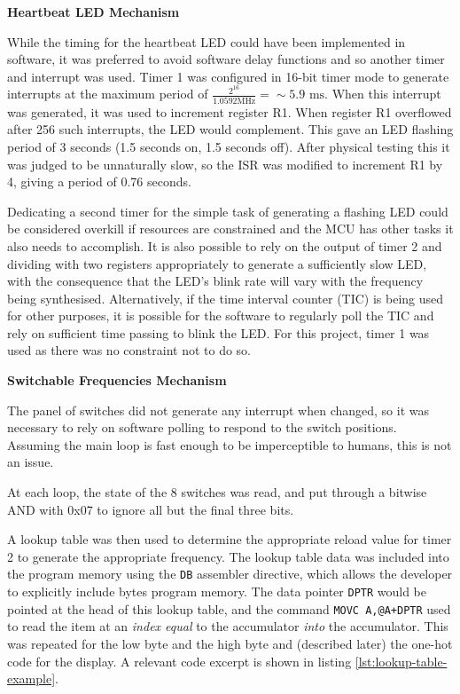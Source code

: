 \documentclass[11pt]{article}
\begin{document}
\textbf{Heartbeat LED Mechanism}

While the timing for the heartbeat LED could have been implemented in software, it was preferred to avoid software delay functions and so another timer and interrupt was used. Timer 1 was configured in 16-bit timer mode to generate interrupts at the maximum period of $\frac{2^{16}}{1.0592 \text{MHz}}=\sim 5.9 \text{ ms}$. When this interrupt was generated, it was used to increment register R1. When register R1 overflowed after 256 such interrupts, the LED would complement. This gave an LED flashing period of 3 seconds (1.5 seconds on, 1.5 seconds off). After physical testing this it was judged to be unnaturally slow, so the ISR was modified to increment R1 by 4, giving a period of 0.76 seconds.

Dedicating a second timer for the simple task of generating a flashing LED could be considered overkill if resources are constrained and the MCU has other tasks it also needs to accomplish. It is also possible to rely on the output of timer 2 and dividing with two registers appropriately to generate a sufficiently slow LED, with the consequence that the LED's blink rate will vary with the frequency being synthesised. Alternatively, if the time interval counter (TIC) is being used for other purposes, it is possible for the software to regularly poll the TIC and rely on sufficient time passing to blink the LED. For this project, timer 1 was used as there was no constraint not to do so.

\textbf{Switchable Frequencies Mechanism}

The panel of switches did not generate any interrupt when changed, so it was necessary to rely on software polling to respond to the switch positions. Assuming the main loop is fast enough to be imperceptible to humans, this is not an issue.

At each loop, the state of the 8 switches was read, and put through a bitwise AND with 0x07 to ignore all but the final three bits.

A lookup table was then used to determine the appropriate reload value for timer 2 to generate the appropriate frequency. The lookup table data was included into the program memory using the \texttt{DB} assembler directive, which allows the developer to explicitly include bytes program memory. The data pointer \texttt{DPTR} would be pointed at the head of this lookup table, and the command \texttt{MOVC A,@A+DPTR} used to read the item at an \textit{index equal} to the accumulator \textit{into} the accumulator. This was repeated for the low byte and the high byte and (described later) the one-hot code for the display. A relevant code excerpt is shown in listing \ref{lst:lookup-table-example}.
\end{document}
